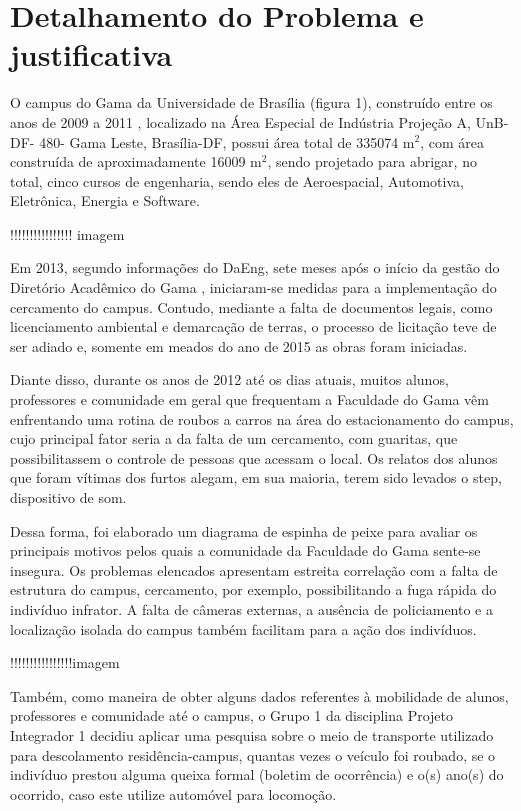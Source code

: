 \section{Detalhamento do Problema e justificativa} %
\label{sec:detalhamentoProblema}

O campus do Gama da Universidade de Brasília (figura 1), construído entre os anos de 2009 a 2011 , localizado na Área Especial de Indústria Projeção A, UnB- DF- 480- Gama Leste, Brasília-DF, possui área total de 335074 m$^2$, com área construída de aproximadamente 16009 m$^2$, sendo projetado para abrigar, no total, cinco cursos de engenharia, sendo eles de Aeroespacial, Automotiva, Eletrônica, Energia e Software.

!!!!!!!!!!!!!!!! imagem

Em 2013, segundo informações do DaEng, sete meses após o início da gestão do Diretório Acadêmico do Gama , iniciaram-se medidas para a implementação do cercamento do campus. Contudo, mediante a falta de documentos legais, como licenciamento ambiental e demarcação de terras, o processo de licitação teve de ser adiado e, somente em meados do ano de 2015 as obras foram iniciadas.

Diante disso, durante os anos de 2012 até os dias atuais, muitos alunos, professores e comunidade em geral que frequentam a Faculdade do Gama vêm enfrentando uma rotina de roubos a carros na área do estacionamento do campus, cujo principal fator seria a da falta de um cercamento, com guaritas, que possibilitassem o controle de pessoas que acessam o local. Os relatos dos alunos que foram vítimas dos furtos alegam, em sua maioria, terem sido levados o step, dispositivo de som.

Dessa forma, foi elaborado um diagrama de espinha de peixe para avaliar os principais motivos pelos quais a comunidade da Faculdade do Gama sente-se insegura. Os problemas elencados apresentam estreita correlação com a falta de estrutura do campus, cercamento, por exemplo, possibilitando a fuga rápida do indivíduo infrator. A falta de câmeras externas, a ausência de policiamento  e a localização isolada do campus também facilitam para a ação dos indivíduos.

!!!!!!!!!!!!!!!!imagem

Também, como maneira de obter alguns dados referentes à mobilidade de alunos, professores e comunidade até o campus, o Grupo 1 da disciplina Projeto Integrador 1 decidiu aplicar uma pesquisa sobre o meio de transporte utilizado para descolamento residência-campus,   quantas vezes o veículo foi roubado, se o indivíduo prestou alguma queixa formal (boletim de ocorrência) e o(s) ano(s) do ocorrido, caso este utilize automóvel para locomoção.

